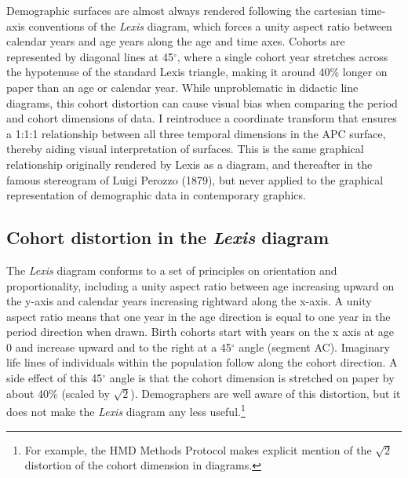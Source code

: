 \documentclass[a4paper]{article}
\begin{document}
Demographic surfaces are almost always rendered following the cartesian time-axis conventions of the \textit{Lexis} diagram, which forces a unity aspect ratio between calendar years and age years along the age and time axes. Cohorts are represented by diagonal lines at 45$^\circ$, where a single cohort year stretches across the hypotenuse of the standard Lexis triangle, making it around 40\% longer on paper than an age or calendar year. While unproblematic in didactic line diagrams, this cohort distortion can cause visual bias when comparing the period and cohort dimensions of data. I reintroduce a coordinate transform that ensures a 1:1:1 relationship between all three temporal dimensions in the APC surface, thereby aiding visual interpretation of surfaces. This is the same graphical relationship originally rendered by Lexis as a diagram, and thereafter in the famous stereogram of Luigi Perozzo (1879), but never applied to the graphical representation of demographic data in contemporary graphics.

\subsection*{Cohort distortion in the \textit{Lexis} diagram}
The \textit{Lexis} diagram conforms to a set of principles on orientation and proportionality, including a unity aspect ratio between age increasing upward on the y-axis and calendar years increasing rightward along the x-axis. A unity aspect ratio means that one year in the age direction is equal to one year in the period direction when drawn. Birth cohorts start with years on the x axis at age 0 and increase upward and to the right at a 45$^\circ$ angle (segment AC). Imaginary life lines of individuals within the population follow along the cohort direction. A side effect of this 45$^\circ$ angle is that the cohort dimension is stretched on paper by about 40\% (scaled by $\sqrt{2}$). Demographers are well aware of this distortion, but it does not make the \textit{Lexis} diagram any less useful.\footnote{For example, the HMD Methods Protocol  makes explicit mention of the $\sqrt{2}$ distortion of the cohort dimension in diagrams.}\\ 
\end{document}
